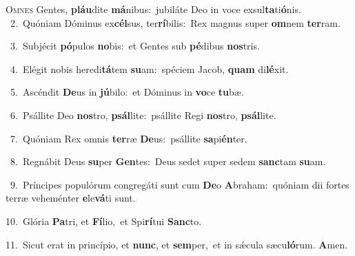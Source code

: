 \lettrine{\initial\textcolor{\initialcolor}{O}}{mnes} Gentes, \textbf{pláu}\-dite \textbf{má}\-nibus:~\star jubiláte Deo in voce exsul\-\textbf{ta}\-ti\-\textbf{ó}\-nis.\\
{\numbfont\textcolor{\numbcolor}{~2.}}~Quóniam Dóminus ex\-\textbf{cél}\-sus, ter\-\textbf{rí}\-bilis:~\star Rex magnus super \textbf{om}\-nem \textbf{ter}\-ram.\par
{\numbfont\textcolor{\numbcolor}{~3.}}~Subjécit \textbf{pó}\-pulos \textbf{no}\-bis:~\star et Gentes sub \textbf{pé}\-dibus \textbf{nos}\-tris.\par
{\numbfont\textcolor{\numbcolor}{~4.}}~Elégit nobis heredi\-\textbf{tá}\-tem \textbf{su}\-am:~\star spéciem Jacob, \textbf{quam} di\-\textbf{lé}\-xit.\par
{\numbfont\textcolor{\numbcolor}{~5.}}~Ascéndit \textbf{De}\-us in \textbf{jú}\-bilo:~\star et Dóminus in \textbf{vo}\-ce \textbf{tu}\-bæ.\par
{\numbfont\textcolor{\numbcolor}{~6.}}~Psállite Deo \textbf{nos}\-tro, \textbf{psál}\-lite:~\star psállite Regi \textbf{nos}\-tro, \textbf{psál}\-lite.\par
{\numbfont\textcolor{\numbcolor}{~7.}}~Quóniam Rex omnis \textbf{ter}\-ræ \textbf{De}\-us:~\star psállite \textbf{sa}\-pi\-\textbf{én}\-ter.\par
{\numbfont\textcolor{\numbcolor}{~8.}}~Regnábit Deus \textbf{su}\-per \textbf{Gen}\-tes:~\star Deus sedet super sedem \textbf{sanc}\-tam \textbf{su}\-am.\par
{\numbfont\textcolor{\numbcolor}{~9.}}~Príncipes populórum congregáti sunt cum \textbf{De}\-o \textbf{A}\-braham:~\star quóniam dii fortes terræ veheménter \textbf{e}\-le\-\textbf{vá}\-ti sunt.\par
{\numbfont\textcolor{\numbcolor}{10.}}~Glória \textbf{Pa}\-tri, et \textbf{Fí}\-lio,~\star et Spi\-\textbf{rí}\-tui \textbf{Sanc}\-to.\par
{\numbfont\textcolor{\numbcolor}{11.}}~Sicut erat in princípio, et \textbf{nunc}\-, et \textbf{sem}\-per,~\star et in sǽcula sæcu\-\textbf{ló}\-rum. \textbf{A}\-men.\par
